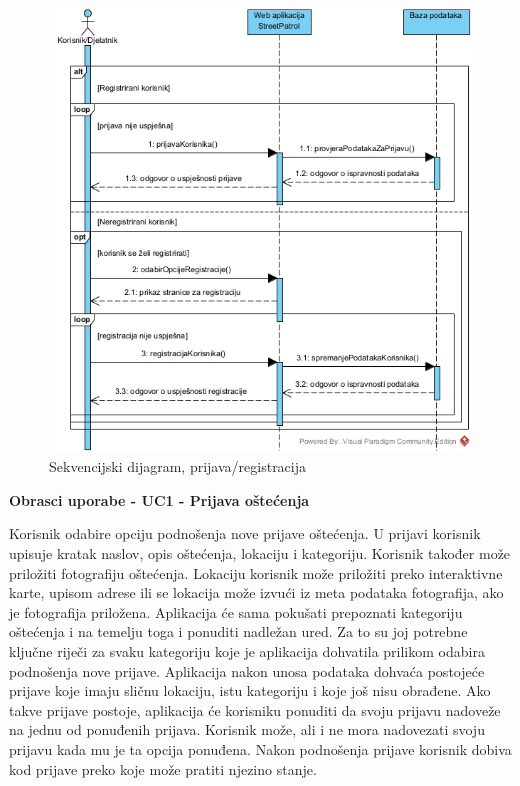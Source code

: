 				\begin{figure}[H]
					\includegraphics[width=\textwidth]{slike/Prijava_registracijaSD.jpg} %
					\caption{Sekvencijski dijagram, prijava/registracija}
					\label{fig:sekvencijskiDijagram1} %
				\end{figure}
				\eject
				
				\textbf{Obrasci uporabe - UC1 - Prijava oštećenja}
				
				Korisnik odabire opciju podnošenja nove prijave oštećenja. U prijavi korisnik upisuje kratak naslov, opis oštećenja, lokaciju i kategoriju. Korisnik također može priložiti fotografiju oštećenja. Lokaciju korisnik može priložiti preko interaktivne karte, upisom adrese ili se lokacija može izvući iz meta podataka fotografija, ako je fotografija priložena. Aplikacija će sama pokušati prepoznati kategoriju oštećenja i na temelju toga i ponuditi nadležan ured. Za to su joj potrebne ključne riječi za svaku kategoriju koje je aplikacija dohvatila prilikom odabira podnošenja nove prijave. Aplikacija nakon unosa podataka dohvaća postojeće prijave koje imaju sličnu lokaciju, istu kategoriju i koje još nisu obrađene. Ako takve prijave postoje, aplikacija će korisniku ponuditi da svoju prijavu nadoveže na jednu od ponuđenih prijava. Korisnik može, ali i ne mora nadovezati svoju prijavu kada mu je ta opcija ponuđena. Nakon podnošenja prijave korisnik dobiva kod prijave preko koje može pratiti njezino stanje.
				
